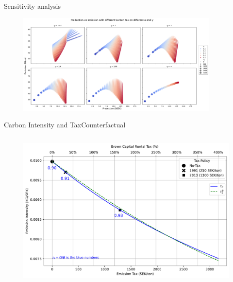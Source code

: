 \documentclass[aspectratio=169]{beamer}
\begin{document}
\begin{frame}{Sensitivity analysis}\label{sensitivity}
	\begin{figure}[http]
		\centering
		\includegraphics[width=0.9\textwidth]{Figures/production_emission.pdf}
	\end{figure}
	\hfill
	\hyperlink{estimation_result}{}
\end{frame}

\begin{frame}{Carbon Intensity and Tax}{{Counterfactual}}{
	\begin{columns}[t]
		\begin{figure}[t]
			\centering
		\includegraphics[width=.85\textwidth]{Figures/intensity_tax_premium.pdf}
		\end{figure}
		\begin{table}[t]
			{}
		\end{table}
	\end{columns}
}


\hfill
{\hyperlink{emission_production}{}}
\end{frame}
\end{document}
